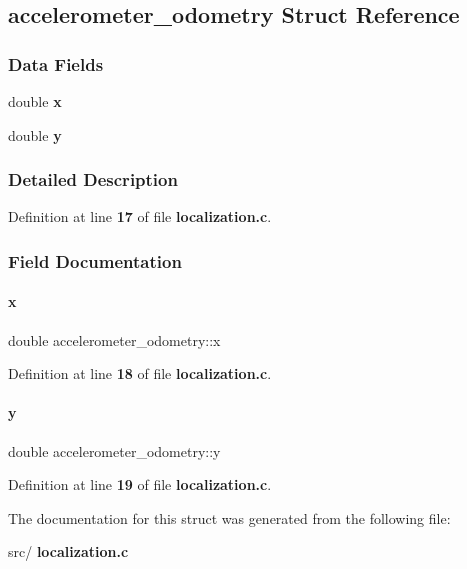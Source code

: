 \subsection{accelerometer\+\_\+odometry Struct Reference}
\label{structaccelerometer__odometry}
\subsubsection*{Data Fields}
\begin{DoxyCompactItemize}
\item 
double \textbf{ x}
\item 
double \textbf{ y}
\end{DoxyCompactItemize}


\subsubsection{Detailed Description}


Definition at line \textbf{ 17} of file \textbf{ localization.\+c}.



\subsubsection{Field Documentation}
\mbox{\label{structaccelerometer__odometry_a83af671d99413a7c480678d5abb9c64a}} 
\paragraph{x}
{\footnotesize\ttfamily double accelerometer\+\_\+odometry\+::x}



Definition at line \textbf{ 18} of file \textbf{ localization.\+c}.

\mbox{\label{structaccelerometer__odometry_a4d812f516efdd477ae9f74fca2a07a2b}} 
\paragraph{y}
{\footnotesize\ttfamily double accelerometer\+\_\+odometry\+::y}



Definition at line \textbf{ 19} of file \textbf{ localization.\+c}.



The documentation for this struct was generated from the following file\+:\begin{DoxyCompactItemize}
\item 
src/\textbf{ localization.\+c}\end{DoxyCompactItemize}
